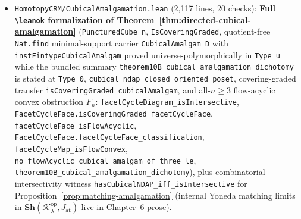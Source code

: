 \documentclass[10pt,twoside,openright]{book}
\theoremstyle{crmplain}
\theoremstyle{crmdef}
\theoremstyle{crmremark}
\begin{document}
\begin{itemize}[leftmargin=1.5em]
  \item \texttt{HomotopyCRM/\allowbreak Cubical\allowbreak Amalgamation.lean} (2,117 lines, 20 checks): \textbf{Full \texttt{\textbackslash leanok} formalization of Theorem~\ref{thm:directed-cubical-amalgamation}} (\texttt{Punctured\allowbreak Cube n}, \texttt{IsCoveringGraded}, quotient-free \texttt{Nat.find} minimal-support carrier \texttt{Cubical\allowbreak Amalgam D} with \texttt{instFintypeCubicalAmalgam} proved universe-polymorphically in \texttt{Type~u} while the bundled summary \texttt{theorem10B\_\allowbreak cubical\_\allowbreak amalgamation\_\allowbreak dichotomy} is stated at \texttt{Type~0}, \texttt{cubical\_\allowbreak ndap\_\allowbreak closed\_\allowbreak oriented\_\allowbreak poset}, covering-graded transfer \texttt{isCoveringGraded\_\allowbreak cubicalAmalgam}, and all-$n \ge 3$ flow-acyclic convex obstruction $F_n$: \texttt{facet\allowbreak Cycle\allowbreak Diagram\_\allowbreak isIntersective}, \texttt{FacetCycleFace.\allowbreak isCoveringGraded\_\allowbreak facetCycleFace}, \texttt{facet\allowbreak Cycle\allowbreak Face\_\allowbreak isFlowAcyclic}, \texttt{FacetCycleFace.\allowbreak facetCycleFace\_\allowbreak classification}, \texttt{facet\allowbreak Cycle\allowbreak Map\_\allowbreak isFlowConvex}, \texttt{no\_\allowbreak flow\allowbreak Acyclic\_\allowbreak cubical\_\allowbreak amalgam\_\allowbreak of\_\allowbreak three\_\allowbreak le}, \texttt{theorem10B\_\allowbreak cubical\_\allowbreak amalgamation\_\allowbreak dichotomy}), plus combinatorial intersectivity witness \texttt{hasCubical\allowbreak NDAP\_\allowbreak iff\_\allowbreak is\allowbreak Intersective} for Proposition~\ref{prop:matching-amalgamation} (internal Yoneda matching limits in $\mathbf{Sh}(\mathcal{K}_\lambda^{\mathrm{op}}, J_{\mathrm{at}})$ live in Chapter~6 prose).

\end{itemize}
\end{document}
